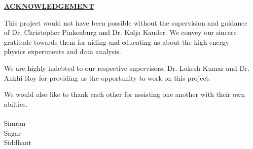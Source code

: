 \begin{center}

    \textbf{\underline{ACKNOWLEDGEMENT}}
\end{center}

    This project would not have been possible without the supervision and guidance of Dr. Christopher Pinkenburg and Dr. Kolja Kauder. We convey our sincere gratitude towards them for aiding and educating us about the high-energy physics experiments and data analysis. 
    
    We are highly indebted to our respective supervisors, Dr. Lokesh Kumar and Dr. Ankhi Roy for providing us the opportunity to work on this project.
    
    We would also like to thank each other for assisting one another with their own abilties.\\
    \\
    Simran\\
    Sagar\\
    Siddhant
    